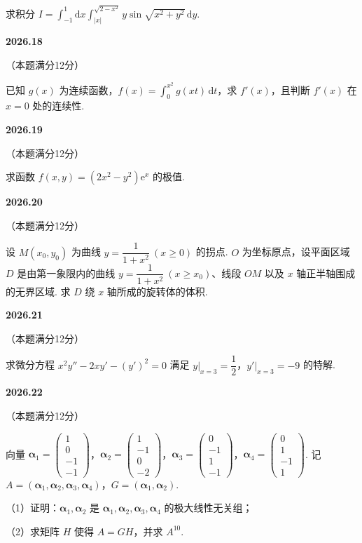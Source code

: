 \documentclass[UTF8,12pt,fontset=windows]{ctexart}
\begin{document}
求积分 $I=\displaystyle\int_{-1}^{1}\mathrm{d}x\int_{|x|}^{\sqrt{2-x^2}}y\sin\sqrt{x^2+y^2}\,\mathrm{d}y$.

\vfill
\newpage
{\large\bfseries 2026.18}

（本题满分12分）

已知 $g(x)$ 为连续函数，$f(x)=\displaystyle\int_0^{x^2}g(xt)\,\mathrm{d}t$，求 $f'(x)$，且判断 $f'(x)$ 在 $x=0$ 处的连续性.

\vfill
\newpage
{\large\bfseries 2026.19}

（本题满分12分）

求函数 $f(x,y)=(2x^2-y^2)\mathrm{e}^x$ 的极值.

\vfill
\newpage
{\large\bfseries 2026.20}

（本题满分12分）

设 $M(x_0,y_0)$ 为曲线 $y=\dfrac{1}{1+x^2}\ (x\geqslant0)$ 的拐点. $O$ 为坐标原点，设平面区域 $D$ 是由第一象限内的曲线 $y=\dfrac{1}{1+x^2}\ (x\geqslant x_0)$、线段 $OM$ 以及 $x$ 轴正半轴围成的无界区域. 求 $D$ 绕 $x$ 轴所成的旋转体的体积.

\vfill
\newpage
{\large\bfseries 2026.21}

（本题满分12分）

求微分方程 $x^2y''-2xy'-(y')^2=0$ 满足 $y\Big|_{x=3}=\dfrac12$，$y'\Big|_{x=3}=-9$ 的特解.

\vfill
\newpage
{\large\bfseries 2026.22}

（本题满分12分）

向量 $\boldsymbol{\alpha}_1=\begin{pmatrix}1\\0\\-1\\-1\end{pmatrix}$，$\boldsymbol{\alpha}_2=\begin{pmatrix}1\\-1\\0\\-2\end{pmatrix}$，$\boldsymbol{\alpha}_3=\begin{pmatrix}0\\-1\\1\\-1\end{pmatrix}$，$\boldsymbol{\alpha}_4=\begin{pmatrix}0\\1\\-1\\1\end{pmatrix}$. 记 $A=(\boldsymbol{\alpha}_1,\boldsymbol{\alpha}_2,\boldsymbol{\alpha}_3,\boldsymbol{\alpha}_4)$，$G=(\boldsymbol{\alpha}_1,\boldsymbol{\alpha}_2)$.

（1）证明：$\boldsymbol{\alpha}_1,\boldsymbol{\alpha}_2$ 是 $\boldsymbol{\alpha}_1,\boldsymbol{\alpha}_2,\boldsymbol{\alpha}_3,\boldsymbol{\alpha}_4$ 的极大线性无关组；

（2）求矩阵 $H$ 使得 $A=GH$，并求 $A^{10}$.

\vfill
\end{document}

